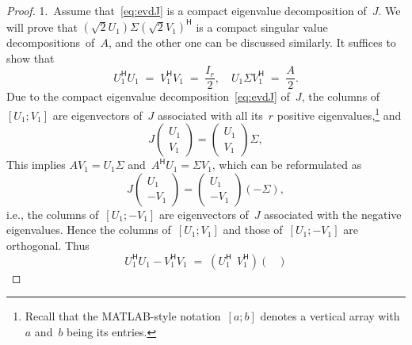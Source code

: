 \documentclass[11pt,a4paper]{article}  %
\numberwithin{equation}{section}
\theoremstyle{definition}
\newcommand{\hmt}{{\scriptscriptstyle{{\mathsf{H}}}}}
\newcommand{\ie}{{i.e.}}
\begin{document}
\begin{proof} 1.~Assume that~\eqref{eq:evdJ} is a compact eigenvalue decomposition of~$J$.
  We will prove that $(\sqrt{2} U_1)\Sigma (\sqrt{2} V_1)^\hmt$ is a
  compact singular value decompositions~of~$A$, and the other one can be discussed similarly.
  It suffices to show that
  \begin{equation}
    \label{eq:svdA}
    U_1^\hmt U_1 \;=\; V_1^\hmt V_1 \;=\; \dfrac{I_r}{2},
    \quad U_1\Sigma V_1^\hmt \;=\; \dfrac{A}{2}.
  \end{equation}
  Due to the compact eigenvalue decomposition~\eqref{eq:evdJ} of~$J$,
  the columns of~$[U_1; V_1]$ are eigenvectors of~$J$ associated with
  all its~$r$ positive eigenvalues,\footnote{
   Recall that the MATLAB-style notation~$[a; b]$ denotes a vertical
   array with~$a$ and~$b$ being its entries.
  }
  and
  \begin{equation}
    \label{eq:evd1}
    J
    \begin{pmatrix}
      U_1 \\
      V_1
    \end{pmatrix}
    =
    \begin{pmatrix}
      U_1 \\
      V_1
    \end{pmatrix}
    \Sigma,
  \end{equation}
   This implies $AV_1 = U_1\Sigma$ and~$A^\hmt U_1 = \Sigma V_1$, which can be reformulated as
  \begin{equation}
    \label{eq:evd2}
    J
    \begin{pmatrix}
      U_1 \\
      -V_1
    \end{pmatrix}
    =
    \begin{pmatrix}
      U_1 \\
      -V_1
    \end{pmatrix}
    (-\Sigma),
  \end{equation}
  \ie, the columns of~$[U_1; -V_1]$ are eigenvectors of~$J$ associated with the negative eigenvalues.
  Hence the columns of~$[U_1; V_1]$ and those of~$[U_1; -V_1]$ are orthogonal. Thus
  \begin{equation*}
    U_1^\hmt U_1 -V_1^\hmt V_1 \;=\;
    (U_1^\hmt \;\, V_1^\hmt)
    \begin{pmatrix}

\end{pmatrix}
\end{equation*}
\end{proof}
\end{document}
